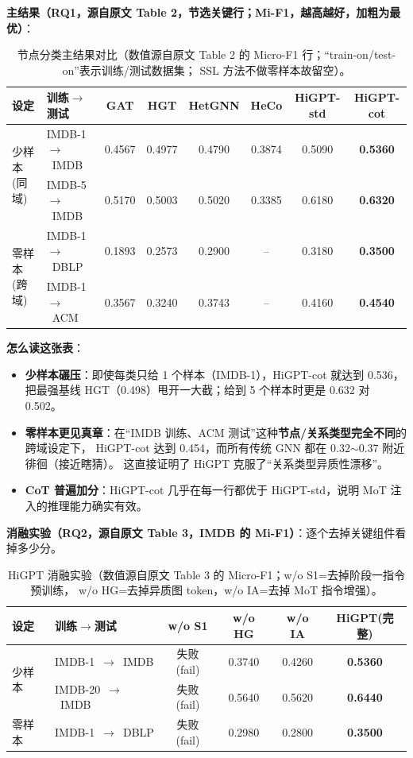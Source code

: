 \documentclass[11pt,UTF8,fontset=fandol]{ctexart}
\begin{document}
\textbf{主结果（RQ1，源自原文 Table 2，节选关键行；Mi-F1，越高越好，加粗为最优）}：

\begin{table}[H]\centering
\caption{节点分类主结果对比（数值源自原文 Table 2 的 Micro-F1 行；“train-on/test-on”表示训练/测试数据集；
SSL 方法不做零样本故留空）。}
\begin{tabular}{llcccccc}
\toprule
\textbf{设定} & 训练$\to$测试 & GAT & HGT & HetGNN & HeCo & \textbf{HiGPT-std} & \textbf{HiGPT-cot} \\
\midrule
\multirow{2}{*}{少样本(同域)}
 & IMDB-1\ $\to$\ IMDB   & 0.4567 & 0.4977 & 0.4790 & 0.3874 & 0.5090 & \textbf{0.5360} \\
 & IMDB-5\ $\to$\ IMDB   & 0.5170 & 0.5003 & 0.5020 & 0.3385 & 0.6180 & \textbf{0.6320} \\
\midrule
\multirow{2}{*}{零样本(跨域)}
 & IMDB-1\ $\to$\ DBLP   & 0.1893 & 0.2573 & 0.2900 & -- & 0.3180 & \textbf{0.3500} \\
 & IMDB-1\ $\to$\ ACM    & 0.3567 & 0.3240 & 0.3743 & -- & 0.4160 & \textbf{0.4540} \\
\bottomrule
\end{tabular}
\end{table}

\textbf{怎么读这张表}：
\begin{itemize}[leftmargin=2em]
  \item \textbf{少样本碾压}：即使每类只给 1 个样本（IMDB-1），HiGPT-cot 就达到 0.536，
        把最强基线 HGT（0.498）甩开一大截；给到 5 个样本时更是 0.632 对 0.502。
  \item \textbf{零样本更见真章}：在“IMDB 训练、ACM 测试”这种\textbf{节点/关系类型完全不同}的跨域设定下，
        HiGPT-cot 达到 0.454，而所有传统 GNN 都在 0.32$\sim$0.37 附近徘徊（接近瞎猜）。
        这直接证明了 HiGPT 克服了“关系类型异质性漂移”。
  \item \textbf{CoT 普遍加分}：HiGPT-cot 几乎在每一行都优于 HiGPT-std，说明 MoT 注入的推理能力确实有效。
\end{itemize}

\textbf{消融实验（RQ2，源自原文 Table 3，IMDB 的 Mi-F1）}：逐个去掉关键组件看掉多少分。

\begin{table}[H]\centering
\caption{HiGPT 消融实验（数值源自原文 Table 3 的 Micro-F1；w/o S1=去掉阶段一指令预训练，
w/o HG=去掉异质图 token，w/o IA=去掉 MoT 指令增强）。}
\begin{tabular}{llcccc}
\toprule
\textbf{设定} & 训练$\to$测试 & w/o S1 & w/o HG & w/o IA & \textbf{HiGPT(完整)} \\
\midrule
\multirow{2}{*}{少样本}
 & IMDB-1\ $\to$\ IMDB & 失败(fail) & 0.3740 & 0.4260 & \textbf{0.5360} \\
 & IMDB-20\ $\to$\ IMDB & 失败(fail) & 0.5640 & 0.5620 & \textbf{0.6440} \\
\midrule
零样本
 & IMDB-1\ $\to$\ DBLP & 失败(fail) & 0.2980 & 0.2800 & \textbf{0.3500} \\
\bottomrule
\end{tabular}
\end{table}
\end{document}
